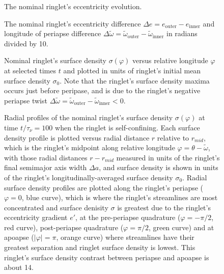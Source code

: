 \documentclass[preprint]{aastex62}
\begin{document}
\begin{figure}
\caption{
\label{fig:e_nominal}
The nominal ringlet's eccentricity evolution.}
\end{figure}

\begin{figure}
    \caption{
        \label{fig:de_nominal}
        The nominal ringlet's eccentricity difference $\Delta e = e_{\text{outer}} - e_{\text{inner}}$
        and longitude of periapse difference
        $\Delta\tilde{\omega} = \tilde{\omega}_{\text{outer}} - \tilde{\omega}_{\text{inner}}$
        in radians divided by 10.
    }
\end{figure}

\begin{figure}
    \caption{
        \label{fig:nominal_sigma_vs_longitude}
        Nominal ringlet's surface density $\sigma(\varphi)$ versus relative
        longitude $\varphi$ at selected times $t$ and plotted in units of ringlet's initial
        mean surface density $\sigma_0$. Note that the ringlet's surface
        density maxima occurs just before peripase,  and is due to the ringlet's
        negative periapse twist 
        $\Delta\tilde{\omega} = \tilde{\omega}_{\text{outer}} - \tilde{\omega}_{\text{inner}} < 0$.
    }
\end{figure}

\begin{figure}
    \caption{
        \label{fig:radial_sigma_nominal}
        Radial profiles of the nominal ringlet's surface density $\sigma(\varphi)$ at time $t/\tau_\nu=100$
        when the ringlet is self-confining. Each surface density profile is plotted versus radial distance $r$ 
        relative to $r_{mid}$, which is the ringlet's midpoint along relative longitude $\varphi = \theta-\tilde{\omega}$,
        with those radial distances $r - r_{mid}$ measured in units of the ringlet's final semimajor axis width $\Delta a$,
        and surface density is shown in units of the ringlet's longitudinally-averaged surface density $\sigma_0$.
        Radial surface density profiles are plotted along the ringlet's periapse ($\varphi=0$, blue curve), which is 
        where the ringlet's streamlines are most concentrated and surface denisity $\sigma$ is
        greatest due to the ringlet's eccentricity gradient $e'$, at the pre-periapse
        quadrature ($\varphi=-\pi/2$, red curve), post-periapse
        quadrature ($\varphi=\pi/2$, green curve)
        and at apoapse ($|\varphi|=\pi$, orange curve) where streamlines have their greatest separation
        and ringlet surface density is lowest. This ringlet's surface density contrast between periapse and
        apoapse is about 14.
    }
\end{figure}
\end{document}
